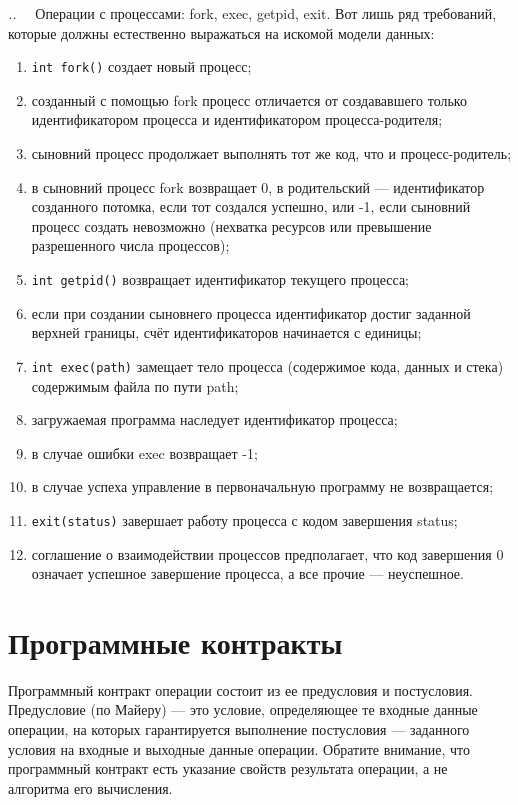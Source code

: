 \documentclass[14pt, twoside]{extreport}
\newcounter{problem_type}[chapter]
\newcounter{zadacha}[problem_type]
\newcommand{\z}{\vspace{0.5cm}\par\addtocounter{zadacha}{1}%
\textit{\arabic{chapter}.\arabic{problem_type}.\arabic{zadacha}}~~  }
\begin{document}
\z Операции с процессами: fork, exec, getpid, exit. Вот лишь ряд требований, которые должны естественно выражаться на искомой модели данных:
\begin{enumerate}
  \item \texttt{int fork()} создает новый процесс;
  \item созданный с помощью fork процесс отличается от создававшего только идентификатором процесса и идентификатором процесса-родителя;
  \item сыновний процесс продолжает выполнять тот же код, что и процесс-родитель;
  \item в сыновний процесс fork возвращает 0, в родительский --- идентификатор созданного потомка, если тот создался успешно, или -1, если сыновний процесс создать невозможно (нехватка ресурсов или превышение разрешенного числа процессов);
  \item \texttt{int getpid()} возвращает идентификатор текущего процесса;
  \item если при создании сыновнего процесса идентификатор достиг заданной верхней границы, счёт идентификаторов начинается с единицы;
  \item \texttt{int exec(path)} замещает тело процесса (содержимое кода, данных и стека) содержимым файла по пути path;
  \item загружаемая программа наследует идентификатор процесса;
  \item в случае ошибки exec возвращает -1;
  \item в случае успеха управление в первоначальную программу не возвращается;
  \item \texttt{exit(status)} завершает работу процесса с кодом завершения status;
  \item соглашение о взаимодействии процессов предполагает, что код завершения 0 означает успешное завершение процесса, а все прочие --- неуспешное.
\end{enumerate}


\section{Программные контракты}

Программный контракт операции состоит из ее предусловия и постусловия. Предусловие (по Майеру) --- это условие, определяющее те входные данные операции, на которых гарантируется выполнение постусловия --- заданного условия на входные и выходные данные операции. Обратите внимание, что программный контракт есть указание свойств результата операции, а не алгоритма его вычисления.
\end{document}
